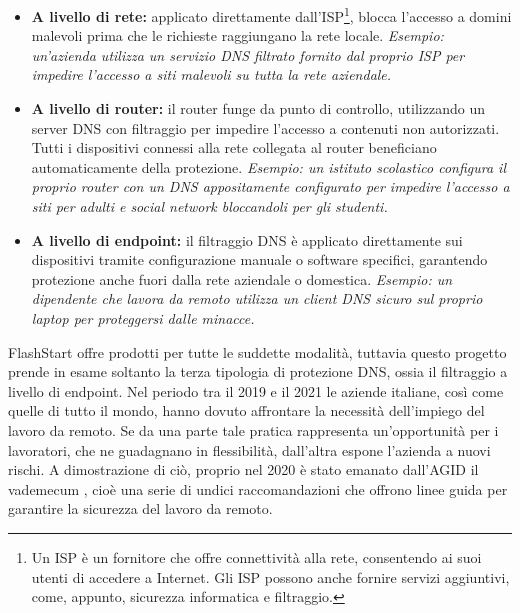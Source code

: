 \documentclass[12pt,a4paper,openright,twoside]{book}
\begin{document}
\begin{itemize}
	\item \textbf{A livello di rete:} applicato direttamente dall'\gls{ISP}\footnote{
		Un \gls{ISP} è un fornitore che offre connettività alla rete, consentendo ai suoi utenti di accedere a Internet. Gli ISP possono anche fornire servizi aggiuntivi, come, appunto, sicurezza informatica e filtraggio.}, blocca l'accesso a domini malevoli prima che le richieste raggiungano la rete locale.  
	\newline \textit{Esempio: un'azienda utilizza un servizio \gls{DNS} filtrato fornito dal proprio \gls{ISP} per impedire l'accesso a siti malevoli su tutta la rete aziendale.}
	
	\item \textbf{A livello di router:} il router funge da punto di controllo, utilizzando un server DNS con filtraggio per impedire l'accesso a contenuti non autorizzati. Tutti i dispositivi connessi alla rete collegata al router beneficiano automaticamente della protezione.
	\newline \textit{Esempio: un istituto scolastico configura il proprio router con un DNS appositamente configurato per impedire l'accesso a siti per adulti e social network bloccandoli per gli studenti.}
	
	\item \textbf{A livello di endpoint:} il filtraggio DNS è applicato direttamente sui dispositivi tramite configurazione manuale o software specifici, garantendo protezione anche fuori dalla rete aziendale o domestica.  
	\newline \textit{Esempio: un dipendente che lavora da remoto utilizza un client DNS sicuro sul proprio laptop per proteggersi dalle minacce.}
\end{itemize}

FlashStart offre prodotti per tutte le suddette modalità, tuttavia questo progetto prende in esame soltanto la terza tipologia di protezione \gls{DNS}, ossia il filtraggio a livello di endpoint.
Nel periodo tra il 2019 e il 2021 le aziende italiane, così come quelle di tutto il mondo, hanno dovuto affrontare la necessità dell'impiego del lavoro da remoto.
Se da una parte tale pratica rappresenta un'opportunità per i lavoratori, che ne guadagnano in flessibilità, dall'altra espone l'azienda a nuovi rischi.
A dimostrazione di ciò, proprio nel 2020 è stato emanato dall'\gls{AGID} il vademecum \cite{AgID2020}, cioè una serie di undici raccomandazioni che offrono linee guida per garantire la sicurezza del lavoro da remoto.
\end{document}
